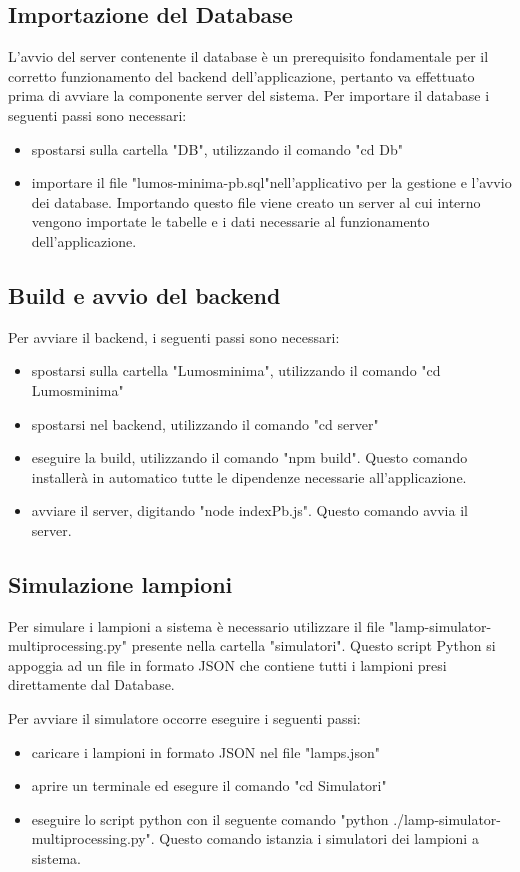 \documentclass[9pt]{article}
\begin{document}
\subsection{Importazione del Database}
L'avvio del server contenente il database è un prerequisito fondamentale per il corretto funzionamento del backend dell'applicazione, pertanto va effettuato prima di avviare la componente server del sistema.
Per importare il database i seguenti passi sono necessari:
\begin{itemize}
	\item spostarsi sulla cartella "DB", utilizzando il comando "cd Db"
	\item importare il file "lumos-minima-pb.sql"nell'applicativo per la gestione e l'avvio dei database. Importando questo file viene creato un server al cui interno vengono importate le tabelle e i dati necessarie al funzionamento dell'applicazione.
\end{itemize}
\subsection{Build e avvio del backend}
Per avviare il backend, i seguenti passi sono necessari:
\begin{itemize}
	\item spostarsi sulla cartella "Lumosminima", utilizzando il comando "cd Lumosminima"
	\item spostarsi nel backend, utilizzando il comando "cd server"
	\item eseguire la build, utilizzando il comando "npm build". Questo comando installerà in automatico tutte le dipendenze necessarie all'applicazione.
	\item avviare il server, digitando "node indexPb.js". Questo comando avvia il server.
\end{itemize}

\subsection{Simulazione lampioni}
Per simulare i lampioni a sistema è necessario utilizzare il file "lamp-simulator-multiprocessing.py" presente nella cartella "simulatori".
Questo script Python si appoggia ad un file in formato JSON che contiene tutti i lampioni presi direttamente dal Database.

Per avviare il simulatore occorre eseguire i seguenti passi:
\begin{itemize}
	\item caricare i lampioni in formato JSON nel file "lamps.json"
	\item aprire un terminale ed esegure il comando "cd Simulatori"
	\item eseguire lo script python con il seguente comando "python ./lamp-simulator-multiprocessing.py". Questo comando istanzia i simulatori dei lampioni a sistema.
\end{itemize}
\end{document}

